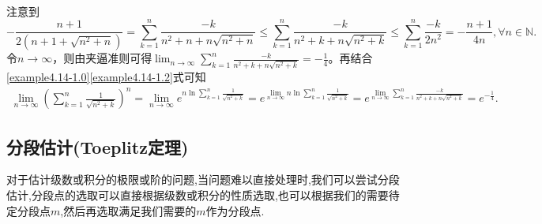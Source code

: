 \documentclass[../../main.tex]{subfiles}%
\begin{document}
\begin{solution}
\begin{align}
\end{align}
注意到
\[
-\frac{n+1}{2\left( n+1+\sqrt{n^2+n} \right)}=\sum\limits_{k=1}^n{\frac{-k}{n^2+n+n\sqrt{n^2+n}}}\leqslant \sum\limits_{k=1}^n{\frac{-k}{n^2+k+n\sqrt{n^2+k}}}\leqslant \sum\limits_{k=1}^n{\frac{-k}{2n^2}}=-\frac{n+1}{4n},\forall n\in \mathbb{N}.
\]
令\(n\rightarrow \infty\)，则由夹逼准则可得\(\lim_{n\rightarrow \infty} \sum\limits_{k=1}^n{\frac{-k}{n^2+k+n\sqrt{n^2+k}}}=-\frac{1}{4}\)。再结合\eqref{example4.14-1.0}\eqref{example4.14-1.2}式可知
\begin{align*}
\lim_{n\rightarrow \infty} \left( \sum\limits_{k=1}^n{\frac{1}{\sqrt{n^2+k}}} \right) ^n=\lim_{n\rightarrow \infty} e^{n\ln \sum\limits_{k=1}^n{\frac{1}{\sqrt{n^2+k}}}}
=e^{\lim\limits_{n\rightarrow \infty} n\ln \sum\limits_{k=1}^n{\frac{1}{\sqrt{n^2+k}}}}
=e^{\lim\limits_{n\rightarrow \infty} \sum\limits_{k=1}^n{\frac{-k}{n^2+k+n\sqrt{n^2+k}}}}
=e^{-\frac{1}{4}}.
\end{align*}

\end{solution}


\subsection{分段估计(Toeplitz定理)}

对于估计级数或积分的极限或阶的问题,当问题难以直接处理时,我们可以尝试分段估计,分段点的选取可以直接根据级数或积分的性质选取,也可以根据我们的需要待定分段点$m$,然后再选取满足我们需要的$m$作为分段点.
\end{document}
